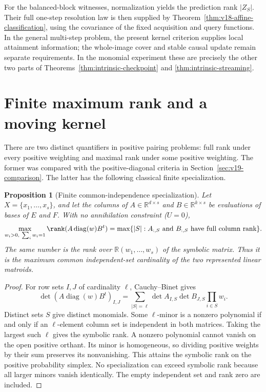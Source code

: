 \documentclass[11pt]{amsart}
\newtheorem{proposition}[theorem]{Proposition}
\theoremstyle{definition}\newtheorem{definition}[theorem]{Definition}
\theoremstyle{remark}\newtheorem{remark}[theorem]{Remark}
\newcommand{\R}{\mathbb R}\newcommand{\N}{\mathbb N}\newcommand{\C}{\mathbb C}
\begin{document}
For the balanced-block witnesses, normalization yields the prediction
rank $|Z_S|$. Their full one-step resolution law is then supplied by
Theorem~\ref{thm:v18-affine-classification}, using the covariance of the
fixed acquisition and query functions. In the general multi-step problem,
the present kernel criterion supplies local attainment information; the
whole-image cover and stable causal update remain separate requirements.
In the monomial experiment these are precisely the other two parts of
Theorems~\ref{thm:intrinsic-checkpoint} and
\ref{thm:intrinsic-streaming}.

\section{Finite maximum rank and a moving kernel}
\label{sec:finite-pairing-comparison}
There are two distinct quantifiers in positive pairing problems: full
rank under every positive weighting and maximal rank under some positive
weighting. The former was compared with the positive-diagonal criteria
in Section~\ref{sec:v19-comparison}. The latter has the following
classical finite specialization.

\begin{proposition}[Finite common-independence specialization]
\label{prop:finite-matroid-rank}
Let $X=\{x_1,\ldots,x_s\}$, and let the columns of
$A\in\R^{d\times s}$ and $B\in\R^{k\times s}$ be evaluations of
bases of $E$ and $F$. With no annihilation constraint ($U=0$),
\begin{equation}\label{eq:finite-matroid-rank}
 \max_{w_i>0,\ \sum_iw_i=1}\rank(A\operatorname{diag}(w)B^t)
 =\max\{|S|: A_{:,S}\text{ and }B_{:,S}\text{ have full column rank}\}.
\end{equation}
The same number is the rank over $\R(w_1,\ldots,w_s)$ of the symbolic
matrix. Thus it is the maximum common independent-set cardinality of
the two represented linear matroids.
\end{proposition}
\begin{proof}
For row sets $I,J$ of cardinality $\ell$, Cauchy--Binet gives
\[
 \det(A\operatorname{diag}(w)B^t)_{I,J}
 =\sum_{|S|=\ell}\det A_{I,S}\det B_{J,S}\prod_{i\in S}w_i.
\]
Distinct sets $S$ give distinct monomials. Some $\ell$-minor is a
nonzero polynomial if and only if an $\ell$-element column set is
independent in both matrices. Taking the largest such $\ell$ gives
the symbolic rank. A nonzero polynomial cannot vanish on the open
positive orthant. Its minor is homogeneous, so dividing positive
weights by their sum preserves its nonvanishing. This attains the
symbolic rank on the positive probability simplex. No specialization
can exceed symbolic rank because all larger minors vanish identically.
The empty independent set and rank zero are included.
\end{proof}
\end{document}
